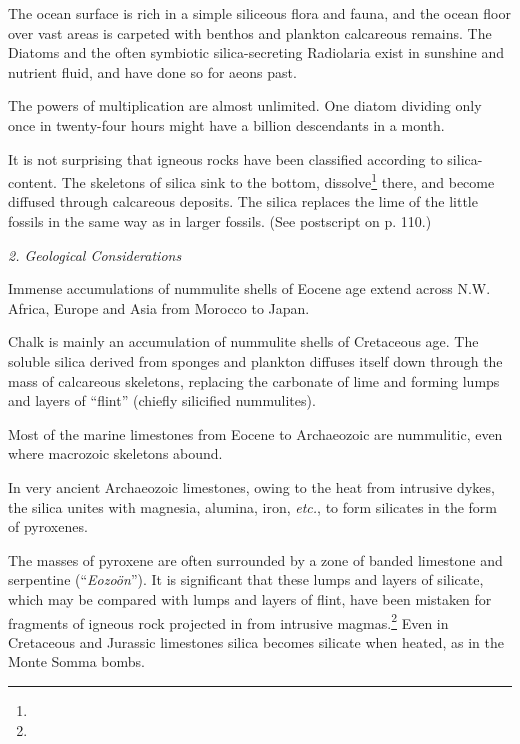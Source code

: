 \documentclass[a4paper, 12pt, oneside]{article}
\begin{document}
The ocean surface is rich in a simple siliceous flora and fauna, and the ocean floor over vast areas is carpeted with benthos and plankton calcareous remains. The Diatoms and the often symbiotic silica-secreting Radiolaria exist in sunshine and nutrient fluid, and have done so for aeons past.

The powers of multiplication are almost unlimited. One diatom dividing only once in twenty-four hours might have a billion descendants in a month.

It is not surprising that igneous rocks have been classified according to silica-content. The skeletons of silica sink to the bottom, dissolve\footnote{} there, and become diffused through calcareous deposits. The silica replaces the lime of the little fossils in the same way as in larger fossils. (See postscript on p. 110.)

\bigskip
\centerline{\emph{2. Geological Considerations}}

Immense accumulations of nummulite shells of Eocene age extend across N.W. Africa, Europe and Asia from Morocco to Japan.

Chalk is mainly an accumulation of nummulite shells of Cretaceous age. The soluble silica derived from sponges and plankton diffuses itself down through the mass of calcareous skeletons, replacing the carbonate of lime and forming lumps and layers of ``flint'' (chiefly silicified nummulites).

Most of the marine limestones from Eocene to Archaeozoic are nummulitic, even where macrozoic skeletons abound.

In very ancient Archaeozoic limestones, owing to the heat from intrusive dykes, the silica unites with magnesia, alumina, iron, \emph{etc.}, to form silicates in the form of pyroxenes.

The masses of pyroxene are often surrounded by a zone of banded limestone and serpentine (``\emph{Eozoön}''). It is significant that these lumps and layers of silicate, which may be compared with lumps and layers of flint, have been mistaken for fragments of igneous rock projected in from intrusive magmas.\footnote{} Even in Cretaceous and Jurassic limestones silica becomes silicate when heated, as in the Monte Somma bombs.
\end{document}
